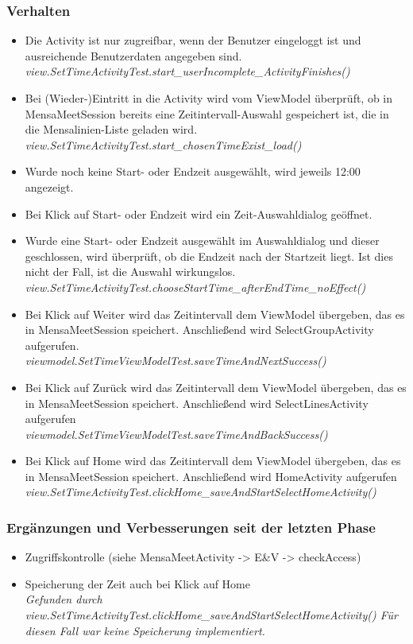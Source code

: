 \documentclass[a4paper]{scrreprt}
\begin{document}
\subsubsection{Verhalten}
\begin{itemize}
\item Die Activity ist nur zugreifbar, wenn der Benutzer eingeloggt ist und ausreichende Benutzerdaten angegeben sind.\\
\textit{view.SetTimeActivityTest.start\_userIncomplete\_ActivityFinishes()}
\item Bei (Wieder-)Eintritt in die Activity wird vom ViewModel überprüft, ob in MensaMeetSession bereits eine Zeitintervall-Auswahl gespeichert ist, die in die Mensalinien-Liste geladen wird.\\
\textit{view.SetTimeActivityTest.start\_chosenTimeExist\_load()}
\item Wurde noch keine Start- oder Endzeit ausgewählt, wird jeweils 12:00 angezeigt.
\item Bei Klick auf Start- oder Endzeit wird ein Zeit-Auswahldialog geöffnet.
\item Wurde eine Start- oder Endzeit ausgewählt im Auswahldialog und dieser geschlossen, wird überprüft, ob die Endzeit nach der Startzeit liegt. Ist dies nicht der Fall, ist die Auswahl wirkungslos. \\
\textit{view.SetTimeActivityTest.chooseStartTime\_afterEndTime\_noEffect()}
\item Bei Klick auf Weiter wird das Zeitintervall dem ViewModel übergeben, das es in MensaMeetSession speichert. Anschließend wird SelectGroupActivity aufgerufen.\\
\textit{viewmodel.SetTimeViewModelTest.saveTimeAndNextSuccess()}
\item Bei Klick auf Zurück wird das Zeitintervall dem ViewModel übergeben, das es in MensaMeetSession speichert. Anschließend wird SelectLinesActivity aufgerufen\\
\textit{viewmodel.SetTimeViewModelTest.saveTimeAndBackSuccess()}
\item Bei Klick auf Home wird das Zeitintervall dem ViewModel übergeben, das es in MensaMeetSession speichert. Anschließend wird HomeActivity aufgerufen \\
\textit{view.SetTimeActivityTest.clickHome\_saveAndStartSelectHomeActivity()}
\end{itemize}

\subsubsection{Ergänzungen und Verbesserungen seit der letzten Phase}
\begin{itemize}
\item Zugriffskontrolle (siehe MensaMeetActivity -> E\&V -> checkAccess)
\item Speicherung der Zeit auch bei Klick auf Home\\
\textit{Gefunden durch view.SetTimeActivityTest.clickHome\_saveAndStartSelectHomeActivity()
Für diesen Fall war keine Speicherung implementiert.
}
\end{itemize}
\end{document}
